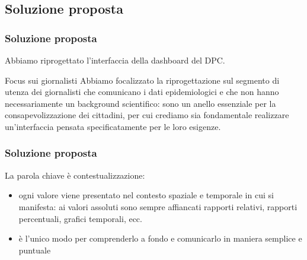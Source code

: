 \documentclass[../../main.tex]{subfiles}
\begin{document}
\subsection{Soluzione proposta}

\begin{frame}
    \frametitle{Soluzione proposta}
    Abbiamo riprogettato l'interfaccia della dashboard del DPC.

    \vspace{-40pt}
    \begin{block}{Focus sui giornalisti}
        Abbiamo focalizzato la riprogettazione sul segmento di utenza dei giornalisti che comunicano i dati epidemiologici e che non hanno necessariamente un background scientifico: sono un anello essenziale per la consapevolizzazione dei cittadini, per cui crediamo sia fondamentale realizzare un'interfaccia pensata specificatamente per le loro esigenze.
    \end{block}

\end{frame}

\begin{frame}
    \frametitle{Soluzione proposta}
    
    La parola chiave è \alert{contestualizzazione}:
    \begin{itemize}
        \item ogni valore viene presentato nel contesto spaziale e temporale in cui si manifesta: ai valori assoluti sono sempre affiancati rapporti relativi, rapporti percentuali, grafici temporali, ecc.
        \item è l'unico modo per comprenderlo a fondo e comunicarlo in maniera semplice e puntuale
    \end{itemize}
    

\end{frame}
\end{document}

